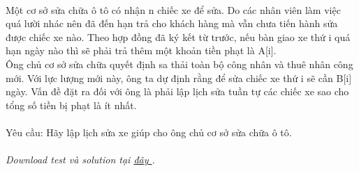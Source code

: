  

Một cơ sở sửa chữa ô tô có nhận n chiếc xe để sửa. Do các nhân viên làm việc quá lười nhác nên đã đến hạn trả cho khách hàng mà vẫn chưa tiến hành sửa được chiếc xe nào. Theo hợp đồng đã ký kết từ trước, nếu bàn giao xe thứ i quá hạn ngày nào thì sẽ phải trả thêm một khoản tiền phạt là A[i].
\\Ông chủ cơ sở sửa chữa quyết định sa thải toàn bộ công nhân và thuê nhân công mới. Với lực lượng mới này, ông ta dự định rằng để sửa chiếc xe thứ i sẽ cần B[i] ngày. Vấn đề đặt ra đối với ông là phải lập lịch sửa tuần tự các chiếc xe sao cho tổng số tiền bị phạt là ít nhất.
\\
\\Yêu cầu: Hãy lập lịch sửa xe giúp cho ông chủ cơ sở sửa chữa ô tô.
\\
\\\emph{Download test và solution tại \href{http://www.spoj.pl/CSP/content/CAR.rar}{ đây } . }